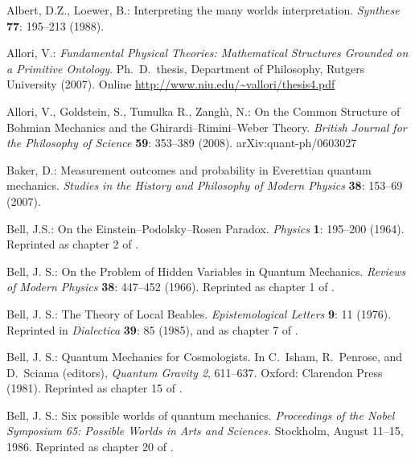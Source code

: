 \documentclass[12pt]{article}
\begin{document}
\begin{thebibliography}{29}



 Albert, D.Z., Loewer, B.: 
	Interpreting the many worlds interpretation.
	\textit{Synthese} \textbf{77}: 195--213 (1988).

 Allori, V.: 
	\textit{Fundamental Physical Theories: Mathematical Structures Grounded 
	on a Primitive Ontology}. Ph.~D.~thesis, Department of Philosophy,
	Rutgers University (2007). Online 
	\url{http://www.niu.edu/~vallori/thesis4.pdf}

 Allori, V., Goldstein, S., Tumulka R., Zangh\`\i, N.:
  On the Common Structure of Bohmian Mechanics and the
  Ghirardi--Rimini--Weber Theory. 
  \textit{British Journal for the Philosophy of Science}
  \textbf{59}: 353--389 (2008).
  arXiv:quant-ph/0603027

  Baker, D.: 
	Measurement outcomes and probability in Everettian quantum mechanics. 
	\textit{Studies in the History and Philosophy of Modern Physics} 
	\textbf{38}: 153--69 (2007). 

 Bell, J.S.: On the
    Einstein--Podolsky--Rosen Paradox.  \textit{Physics}
    \textbf{1}: 195--200 (1964).  Reprinted as chapter 2 of \cite{Bell87b}.

 Bell, J. S.: On the Problem of Hidden Variables in
  Quantum Mechanics. \textit{Reviews of Modern Physics} \textbf{38}: 447--452
  (1966). Reprinted as chapter 1 of \cite{Bell87b}.

 Bell, J. S.: The Theory of Local Beables.
  \textit{Epistemological Letters} \textbf{9}: 11 (1976). Reprinted in 
  \textit{Dialectica} \textbf{39}: 85 (1985), and as chapter 7 of
  \cite{Bell87b}.

 Bell, J. S.: Quantum Mechanics for Cosmologists. In
  C.~Isham, R.~Penrose, and D.~Sciama (editors), \textit{Quantum Gravity
    2}, 611--637. Oxford: Clarendon Press (1981). Reprinted as chapter 15 of
  \cite{Bell87b}.

 Bell, J. S.: Six possible worlds of quantum mechanics.
	\textit{Proceedings of the Nobel Symposium 65: Possible Worlds
	in Arts and Sciences.} Stockholm, August 11--15, 1986.
	Reprinted as chapter 20 of \cite{Bell87b}.
 

\end{thebibliography}
\end{document}
